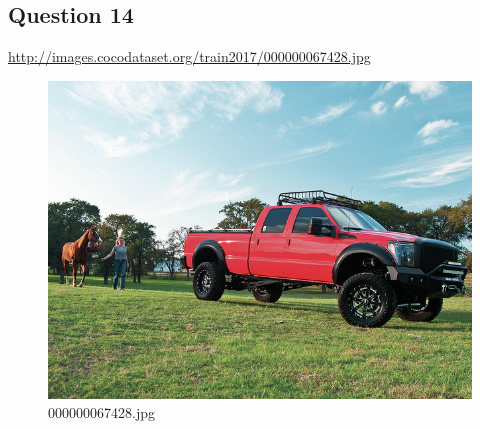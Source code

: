 \subsection*{Question 14}
\url{http://images.cocodataset.org/train2017/000000067428.jpg}
    \begin{figure}[h]
        \centering
        \includegraphics[width=0.8\linewidth]{../image set/easy/000000067428.jpg}
        \caption{000000067428.jpg}
    \end{figure}
